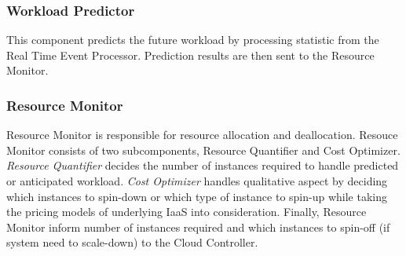 \subsubsection{Workload Predictor}
This component predicts the future workload by processing statistic from the Real Time Event Processor. Prediction results are then sent to the Resource Monitor.

\subsubsection{Resource Monitor}
Resource Monitor is responsible for resource allocation and deallocation. Resouce Monitor consists of two subcomponents, Resource Quantifier and Cost Optimizer. \textit{Resource Quantifier} decides the number of instances required to handle predicted or anticipated workload. \textit{Cost Optimizer} handles qualitative aspect by deciding which instances to spin-down or which type of instance to spin-up while taking the pricing models of underlying IaaS into consideration. Finally, Resource Monitor inform number of instances required and which instances to spin-off (if system need to scale-down) to the Cloud Controller.